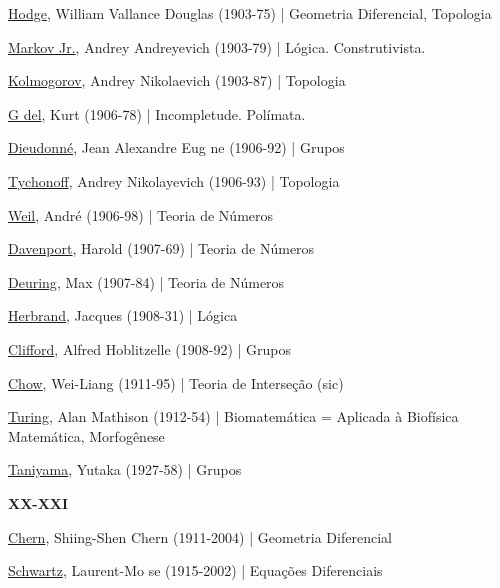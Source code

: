 \documentclass[12pt,a4paper]{article}
\begin{document}
			\href{http://en.wikipedia.org/wiki/W._V._D._Hodge}{Hodge}, William Vallance Douglas (1903-75) | Geometria Diferencial, Topologia

			\href{http://en.wikipedia.org/wiki/Andrey_Markov_(Soviet_mathematician)}{Markov Jr.}, Andrey Andreyevich (1903-79) | L\'ogica. Construtivista.

			\href{http://en.wikipedia.org/wiki/Andrey_Kolmogorov}{Kolmogorov}, Andrey Nikolaevich (1903-87) | Topologia

			\href{http://pt.wikipedia.org/wiki/Kurt_G\%C3\%B6del}{G del}, Kurt (1906-78) | Incompletude. Pol\'imata.

			\href{http://en.wikipedia.org/wiki/Jean_Dieudonn\%C3\%A9}{Dieudonn\'e}, Jean Alexandre Eug ne (1906-92) | Grupos

			\href{http://en.wikipedia.org/wiki/Andrey_Nikolayevich_Tychonoff}{Tychonoff}, Andrey Nikolayevich (1906-93) | Topologia

			\href{http://en.wikipedia.org/wiki/Andr\%C3\%A9_Weil}{Weil}, Andr\'e (1906-98) | Teoria de N\'umeros

			\href{http://en.wikipedia.org/wiki/Harold_Davenport}{Davenport}, Harold (1907-69) | Teoria de N\'umeros

			\href{http://en.wikipedia.org/wiki/Max_Deuring}{Deuring}, Max (1907-84) | Teoria de N\'umeros

			\href{http://en.wikipedia.org/wiki/Herbrand}{Herbrand}, Jacques (1908-31) | L\'ogica

			\href{http://en.wikipedia.org/wiki/Alfred_H._Clifford}{Clifford}, Alfred Hoblitzelle (1908-92) | Grupos

			\href{http://en.wikipedia.org/wiki/Chow\%27s_theorem}{Chow}, Wei-Liang (1911-95) | Teoria de Interse\c{c}\~ao (sic)

			\href{http://en.wikipedia.org/wiki/Alan_Turing}{Turing}, Alan Mathison (1912-54) | Biomatem\'atica = Aplicada \`a Biof\'isica Matem\'atica, Morfog\^enese

			\href{http://en.wikipedia.org/wiki/Yutaka_Taniyama}{Taniyama}, Yutaka (1927-58) | Grupos

			\begin{flushright}
			\end{flushright}

			\textbf{XX-XXI}

			\href{http://en.wikipedia.org/wiki/Chern_class}{Chern}, Shiing-Shen Chern (1911-2004) | Geometria Diferencial

			\href{http://en.wikipedia.org/wiki/Laurent_Schwarz}{Schwartz}, Laurent-Mo se (1915-2002) | Equa\c{c}\~oes Diferenciais
\end{document}
